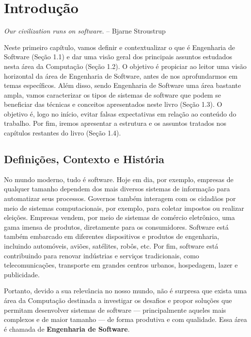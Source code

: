\documentclass[
  11pt,
  twoside]{book}
\renewenvironment{quote}{\centering \vspace{1.5ex} \begin{tcolorbox}[colback=backcolor, width=4.9in]}{\end{tcolorbox}}
\begin{document}
\mainmatter

\hypertarget{introduuxe7uxe3o}{%
\chapter{Introdução}\label{introduuxe7uxe3o}}

\begin{quote}
\emph{Our civilization runs on software.} -- Bjarne Stroustrup
\end{quote}

Neste primeiro capítulo, vamos definir e contextualizar o que é
Engenharia de Software (Seção 1.1) e dar uma visão geral dos principais
assuntos estudados nesta área da Computação (Seção 1.2). O objetivo é
propiciar ao leitor uma visão horizontal da área de Engenharia de
Software, antes de nos aprofundarmos em temas específicos. Além disso,
sendo Engenharia de Software uma área bastante ampla, vamos caracterizar
os tipos de sistemas de software que podem se beneficiar das técnicas e
conceitos apresentados neste livro (Seção 1.3). O objetivo é, logo no
início, evitar falsas expectativas em relação ao conteúdo do trabalho.
Por fim, iremos apresentar a estrutura e os assuntos tratados nos
capítulos restantes do livro (Seção 1.4).

\hypertarget{definiuxe7uxf5es-contexto-e-histuxf3ria}{%
\section{Definições, Contexto e
História}\label{definiuxe7uxf5es-contexto-e-histuxf3ria}}

No mundo moderno, tudo é software. Hoje em dia, por exemplo, empresas de
qualquer tamanho dependem dos mais diversos sistemas de informação para
automatizar seus processos. Governos também interagem com os cidadãos
por meio de sistemas computacionais, por exemplo, para coletar impostos
ou realizar eleições. Empresas vendem, por meio de sistemas de comércio
eletrônico, uma gama imensa de produtos, diretamente para os
consumidores. Software está também embarcado em diferentes dispositivos
e produtos de engenharia, incluindo automóveis, aviões, satélites,
robôs, etc. Por fim, software está contribuindo para renovar indústrias
e serviços tradicionais, como telecomunicações, transporte em grandes
centros urbanos, hospedagem, lazer e publicidade.

Portanto, devido a sua relevância no nosso mundo, não é surpresa que
exista uma área da Computação destinada a investigar os desafios e
propor soluções que permitam desenvolver sistemas de software ---
principalmente aqueles mais complexos e de maior tamanho --- de forma
produtiva e com qualidade. Essa área é chamada de \textbf{Engenharia de
Software}.
\end{document}
